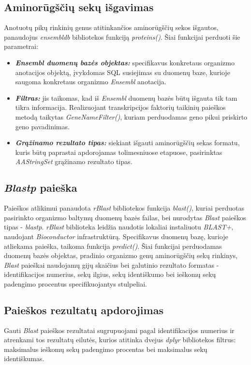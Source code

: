 \documentclass[12pt]{article}
\begin{document}
\subsection{Aminorūgščių sekų išgavimas}
Anotuotų pikų rinkinių genus atitinkančios aminorūgščių sekos išgautos,
panaudojus \emph{ensembldb}\cite{ENSEMBLDB} bibliotekos funkciją 
\emph{proteins()}. Šiai funkcijai perduoti šie parametrai:

\begin{itemize}
    \item \textbf{\emph{Ensembl duomenų bazės objektas:}} specifikavus
        konkretaus organizmo anotacijos objektą, įvykdomas SQL susiejimas su
        duomenų baze, kurioje saugoma konkretaus organizmo \emph{Ensembl}
        anotacija.
    \item \textbf{\emph{Filtras:}} jis taikomas, kad iš \emph{Ensembl} duomenų
        bazės būtų išgauta tik tam tikra informacija. Realizuojant
        transkripcijos faktorių taikinių paieškos metodą taikytas
        \emph{GeneNameFilter()}, kuriam perduodamas geno pikui priskirto geno
        pavadinimas.
    \item \textbf{\emph{Grąžinamo rezultato tipas:}} siekiant išgauti
        aminorūgščių sekas formatu, kuris būtų paprastai apdorojamas
        tolimesniuose etapuose, pasirinktas \emph{AAStringSet} grąžinamo
        rezultato tipas.
\end{itemize}

\subsection{\emph{Blastp} paieška}
Paieškos atlikimui panaudota \emph{rBlast}\cite{RBLAST} bibliotekos funkcija
\emph{blast()}, kuriai perduotas pasirinkto organizmo baltymų duomenų bazės
failas, bei nurodytas \emph{Blast} paieškos tipas - \emph{blastp}.
\emph{rBlast} biblioteka leidžia naudotis lokaliai instaliuotu
\emph{BLAST+}\cite{BLAST}, naudojant \emph{Bioconductor} in\-fra\-struk\-tū\-rą.
Specifikavus duomenų bazę, kurioje atliekama paieška, taikoma funkcija
\emph{predict()}. Šiai funkcijai perduodamas duomenų bazės objektas, pradinio
organizmo genų aminorūgščių sekų rinkinys, \emph{Blast} paieškai naudojamų gijų
skaičius bei galutinio rezultato formatas - identifikacijos numerius, sekų
ilgius, sekų identiškumo bei ieškomų sekų padengimo procentus specifikuojantys
stulpeliai.

\subsection{Paieškos rezultatų apdorojimas}
Gauti \emph{Blast} paieškos rezultatai sugrupuojami pagal identifikacijos
numerius ir atrenkami tos rezultatų eilutės, kurios atitinka dvejus \emph{dplyr}
bibliotekos filtrus: maksimalus ieškomų sekų padengimo procentas bei maksimalus
sekų identiškumas.
\end{document}
